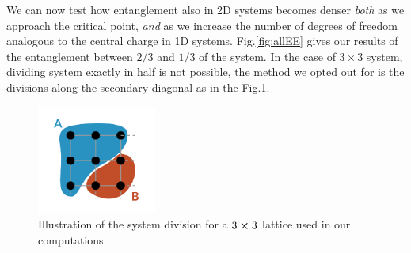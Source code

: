 	We can now test how entanglement also in  2D systems becomes denser {\em both} as we approach the critical point, {\em and} as we increase the number of degrees of freedom analogous to the central charge in 1D systems. Fig.\ref{fig:allEE} gives our results of the entanglement between $2/3$ and $1/3$ of the system. In the case of $3 \times 3$ system, dividing system exactly in half is not possible, the method we opted out for is the divisions along the secondary diagonal as in the Fig.\ref{fig:division}.
	\begin{figure}[t]
		\centering
		\includegraphics[width=0.35\textwidth]{figures/chapter3/latticeDivision.pdf}
		\caption{Illustration of the system division for a $3 \cross 3$ lattice used in our computations.}
		\label{fig:division}
	\end{figure}
	
